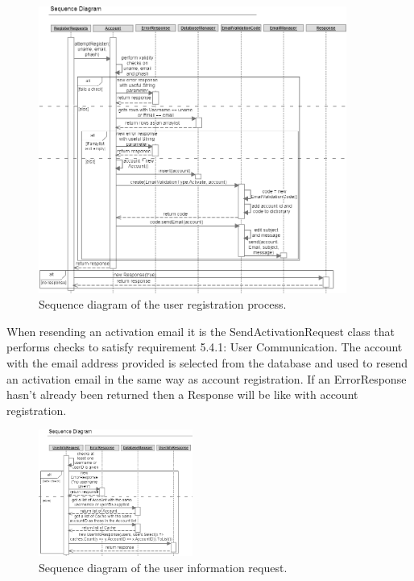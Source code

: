 \begin{figure}
    \centering
    \includegraphics[width=0.9\textwidth]{images/sequence/registerUser}
    \caption{Sequence diagram of the user registration process.}
\end{figure}

When resending an activation email it is the SendActivationRequest class that performs checks to satisfy requirement 5.4.1: User Communication. The account with the email address provided is selected from the database and used to resend an activation email in the same way as account registration. If an ErrorResponse hasn't already been returned then a Response will be like with account registration.

\begin{figure}
    \includegraphics[width=0.45\textwidth]{images/sequence/userinfo}
    \caption{Sequence diagram of the user information request.}
    \label{fig:userInfo}
\end{figure}

